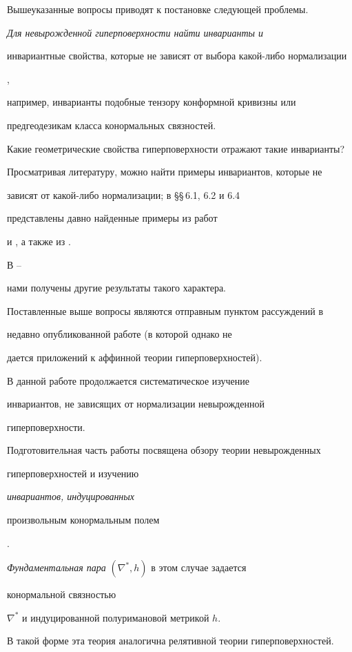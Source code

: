 Вышеуказанные вопросы приводят к постановке следующей проблемы.


{\it Для невырожденной гиперповерхности найти инварианты и


инвариантные свойства, которые не зависят от выбора какой-либо нормализации},


например, инварианты подобные тензору конформной кривизны или


предгеодезикам класса конормальных связностей.


Какие геометрические свойства гиперповерхности отражают такие инварианты?





Просматривая литературу, можно найти примеры инвариантов, которые не


зависят от какой-либо нормализации; в \S\S\,6.1, 6.2 и 6.4


представлены давно найденные примеры из работ


\cite{BLA} и \cite{SCHI}, а также из \cite{NOM-SA}.


В \cite{SIM-2}--\cite{BOK-G-S-3} 




нами получены другие результаты такого характера.


Поставленные выше вопросы являются отправным пунктом рассуждений в


недавно опубликованной работе \cite{BLA-G-N-S} (в которой однако не


дается приложений к аффинной теории гиперповерхностей).





В данной работе продолжается систематическое изучение


инвариантов, не зависящих от нормализации невырожденной


гиперповерхности.


Подготовительная часть работы посвящена обзору теории невырожденных


гиперповерхностей и изучению {\it инвариантов, индуцированных


произвольным конормальным полем}.


{\it Фундаментальная пара} $(\nabla^*,h)$ в этом случае задается


конормальной связностью


$\nabla^*$ и индуцированной полуримановой метрикой $h.$


В такой форме эта теория аналогична релятивной теории гиперповерхностей.


